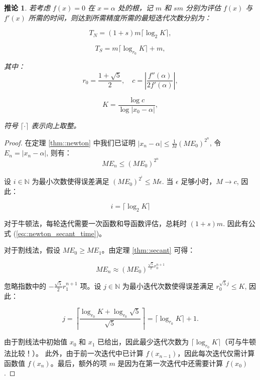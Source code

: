 \documentclass[a4paper]{ctexart}
\newtheorem{corollary}[theorem]{推论}
\numberwithin{theorem}{section}
\numberwithin{equation}{section}
\numberwithin{figure}{section}
\numberwithin{remark}{section}
\begin{document}
\begin{corollary}
    \label{cor::newton_secant_time}
若考虑 \( f(x) = 0 \) 在 \( x = \alpha \) 处的根，记 \( m \) 和 \( sm \) 分别为评估 \( f(x) \) 与 \( f'(x) \) 所需的时间，则达到所需精度所需的最短迭代次数分别为：

\begin{equation}
    \label{eq::newton_secant_time}
T_N = (1 + s)m \lceil \log_2 K \rceil,
\end{equation}

\begin{equation}
T_S = m \lceil \log_{r_0} K \rceil + m,
\end{equation}

其中：
\begin{equation*}
r_0 = \frac{1 + \sqrt{5}}{2}, \quad c = \left| \frac{f''(\alpha)}{2f'(\alpha)} \right|,
\end{equation*}

\begin{equation}
K = \frac{\log c}{\log |x_0 - \alpha|},
\end{equation}

符号 \( \lceil \cdot \rceil \) 表示向上取整。
\end{corollary}

\begin{proof}
在定理 \ref{thm::newton} 中我们已证明 \( |x_n - \alpha| \leq \frac{1}{M} (ME_0)^{2^n} \), 令 \( E_n = |x_n - \alpha| \), 则有：
\[
ME_n \leq (ME_0)^{2^n}
\]

设 \( i \in \mathbb{N} \) 为最小次数使得误差满足 \( (ME_0)^{2^i} \leq M\epsilon \). 当 \( \epsilon \) 足够小时，\( M \to c \), 因此：

\[
i = \lceil \log_2 K \rceil
\]

对于牛顿法，每轮迭代需要一次函数和导函数评估，总耗时 \( (1 + s)m \). 因此有公式 (\ref{eq::newton_secant_time})。

对于割线法，假设 \( ME_0 \geq ME_1 \)。由定理 \ref{thm::secant} 可得：

\[
ME_n \approx (ME_0)^{\frac{\sqrt{5}}{2} r_0^{n+1}}
\]

忽略指数中的 \( -\frac{\sqrt{5}}{2} r_1^{n+1} \) 项。设 \( j \in \mathbb{N} \) 为最小迭代次数使得误差满足 \( r_0^{\sqrt{5} j} \leq K \), 因此：

\[
j = \left\lceil \frac{\log_{r_0} K + \log_{r_0} \sqrt{5}}{\sqrt{5}} \right\rceil = \lceil \log_{r_0} K \rceil + 1.
\]

由于割线法中初始值 \(x_0\) 和 \(x_1\) 已给出，因此最少迭代次数为 \(\lceil \log_{r_0} K \rceil\)（可与牛顿法比较！）。
此外，由于前一次迭代中已计算 \(f(x_{n-1})\)，因此每次迭代仅需计算函数值 \(f(x_n)\)。最后，额外的项 \(m\) 是因为在第一次迭代中还需要计算 \(f(x_0)\).
\end{proof}
\end{document}
